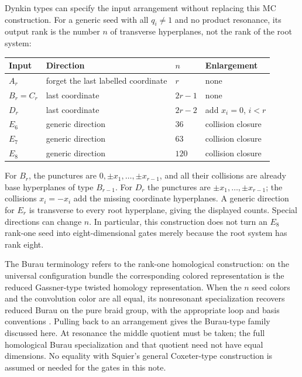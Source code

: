 \documentclass[11pt,a4paper]{article}
\theoremstyle{remark}\newtheorem{remark}[theorem]{Remark}
\begin{document}
Dynkin types can specify the input arrangement without replacing this
MC construction. For a generic seed with all $q_i\ne1$ and no product
resonance, its output rank is the number $n$ of transverse hyperplanes,
not the rank of the root system:
\begin{center}
\begin{tabular}{llll}
\toprule
Input & Direction & $n$ & Enlargement\\
\midrule
$A_r$ & forget the last labelled coordinate & $r$ & none\\
$B_r=C_r$ & last coordinate & $2r-1$ & none\\
$D_r$ & last coordinate & $2r-2$ & add $x_i=0$, $i<r$\\
$E_6$ & generic direction & $36$ & collision closure\\
$E_7$ & generic direction & $63$ & collision closure\\
$E_8$ & generic direction & $120$ & collision closure\\
\bottomrule
\end{tabular}
\end{center}
For $B_r$, the punctures are $0,\pm x_1,\ldots,\pm x_{r-1}$,
and all their collisions are already base hyperplanes of type $B_{r-1}$.
For $D_r$ the punctures are $\pm x_1,\ldots,\pm x_{r-1}$;
the collisions $x_i=-x_i$ add the missing coordinate hyperplanes.
A generic direction for $E_r$ is transverse to every root hyperplane,
giving the displayed counts. Special directions can change $n$.
In particular, this construction does not turn an $E_8$ rank-one seed
into eight-dimensional gates merely because the root system has rank eight.

The Burau terminology refers to the rank-one homological construction:
on the universal configuration bundle the corresponding colored
representation is the reduced Gassner-type twisted homology representation.
When the $n$ seed colors and the convolution color are all equal,
its nonresonant specialization recovers reduced Burau on the pure braid
group, with the appropriate loop and basis conventions \cite{HN}.
Pulling back to an arrangement gives the Burau-type family discussed here.
At resonance the middle quotient must be taken; the full homological
Burau specialization and that quotient need not have equal dimensions.
No equality with Squier's general Coxeter-type construction is assumed
or needed for the gates in this note.
\end{document}
